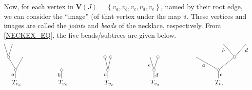 \documentclass[a4paper,10pt
,draft
]{article}%
\numberwithin{equation}{section}
\numberwithin{figure}{section}
\theoremstyle{definition} %
\newcommand{\set}[1]{\left\{#1\right\}}%
\newcommand{\1}{\ensuremath{\mathbbm 1}}%
\begin{document}
Now, for each vertex in $\boldsymbol{V}(J) = \set{v_a, v_b, v_c, v_d, v_e}$, named by their root edge,
we can consider the ``image'' (of that vertex under the map $\mathfrak n$.
These vertices and images are called the \textit{joints} and \textit{beads} of the necklace, respectively.
From \eqref{NECKEX_EQ}, the five beads/subtrees
are given below.
\begin{equation}
        \begin{tikzpicture}[grow=up,auto,level distance=2em, every node/.style = {font=\footnotesize,inner sep=2pt},
                dummy/.style={circle,draw,inner sep=0pt,minimum size=1.375mm}]                
                \tikzstyle{level 2}=[sibling distance=2.25em]%
                \tikzstyle{level 3}=[sibling distance=1.25em]%
                \node at (0,0) [font=\normalsize] {$\ T_{v_a}$}
                child{node [dummy] {}
                  child
                  child{node [dummy] {}
                    child
                    child
                  }
                  edge from parent node {$a$}
                };
                \node (Tb) at (2.5,0) [font=\normalsize] {$\ T_{v_b}$}
                child{node [dummy] {}
                  edge from parent node {$b$}
                };
                \tikzstyle{level 2}=[sibling distance=0.875em]%
                \node (UC) at (5,0) [font=\normalsize] {$\ T_{v_c}$}
                child{node [dummy] {}
                  child{node [dummy] {}}
                  child{node [dummy] {}}
                  edge from parent node {$c$}
                };
                \tikzstyle{level 2}=[sibling distance=1.25em]%
                \node (Ud) at (7.5,0) [font=\normalsize] {$\ T_{v_d}$}
                child{node [dummy] {}
                  child{node[dummy] {}}
                  child{
                    edge from parent node {$c$}}
                  edge from parent node [swap] {$d$}
                };
                \tikzstyle{level 2}=[sibling distance=3.5em]%
                \tikzstyle{level 3}=[sibling distance=2.25em]%
                \tikzstyle{level 4}=[sibling distance=1.25em]%
                \tikzstyle{level 5}=[sibling distance=0.875em]%
                \node (Te) at (11,0) [font=\normalsize] {$\ T_{v_e}$}
                child{node [dummy] {}
                  child[sibling distance = 5em]{node [dummy] {}
                    child[sibling distance = 3.5em]{edge from parent node [swap,near end] {$d$} }
                    child[sibling distance = 3.5em]{edge from parent node [near end] {$b$} }
                  }
                  child[sibling distance = 7em]{ edge from parent node {$a$} }
                  edge from parent node [swap] {$e$}
                };                
        \end{tikzpicture}
\end{equation}
\end{document}
